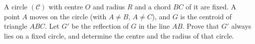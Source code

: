 A circle $(\mathcal C)$ with centre $O$ and radius $R$ and a chord $BC$ of it are fixed. A point $A$ moves on the circle (with $A\ne B$, $A\ne C$), and $G$ is the centroid of triangle $ABC$. Let $G'$ be the reflection of $G$ in the line $AB$. Prove that $G'$ always lies on a fixed circle, and determine the centre and the radius of that circle.

